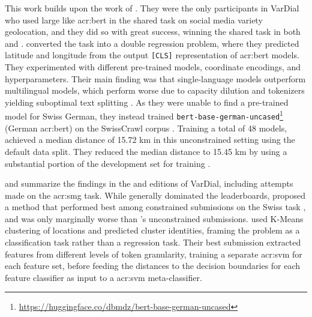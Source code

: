 This work builds upon the work of \cite{scherrerHeLjuVarDial20202020}. They were the only participants in VarDial who used large  like \acrshort{acr:bert} in the shared task on social media variety geolocation, and they did so with great success, winning the shared task in both \citeyear{scherrerHeLjuVarDial20202020} and \citeyear{scherrerSocialMediaVariety2021}. \citeauthor{scherrerHeLjuVarDial20202020} converted the task into a double regression problem, where they predicted latitude and longitude from the output \texttt{[CLS]} representation of \acrshort{acr:bert} models. They experimented with different pre-trained models, coordinate encodings, and hyperparameters. Their main finding was that single-language models outperform multilingual models, which perform worse due to capacity dilution and tokenizers yielding suboptimal text splitting \citep[3]{scherrerHeLjuVarDial20202020}. As they were unable to find a pre-trained model for Swiss German, they instead trained \texttt{bert-base-german-uncased}\footnote{\url{https://huggingface.co/dbmdz/bert-base-german-uncased}} (German \acrshort{acr:bert}) on the SwissCrawl corpus \citep{linderAutomaticCreationText2020}. Training a total of 48 models, \citeauthor{scherrerHeLjuVarDial20202020} achieved a median distance of 15.72 km in this unconstrained setting using the default data split. They reduced the median distance to 15.45 km by using a substantial portion of the development set for training \citep[6]{scherrerHeLjuVarDial20202020}.

\cite{gamanReportVarDialEvaluation2020} and \cite{chakravarthiFindingsVarDialEvaluation2021} summarize the findings in the \citeyear{gamanReportVarDialEvaluation2020} and \citeyear{chakravarthiFindingsVarDialEvaluation2021} editions of VarDial, including attempts made on the \gls{acr:smg} task. While \cite{scherrerHeLjuVarDial20202020} generally dominated the leaderboards, \cite{benitesdeazevedoesouzaZHAWInITSocialMedia2020} proposed a method that performed best among constrained submissions on the Swiss task \citep[8-9]{gamanReportVarDialEvaluation2020}, and was only marginally worse than \citeauthor{scherrerHeLjuVarDial20202020}'s unconstrained submissions. \cite{benitesdeazevedoesouzaZHAWInITSocialMedia2020} used K-Means clustering \citep{lloydLeastSquaresQuantization1982a} of locations and predicted cluster identities, framing the problem as a classification task rather than a regression task. Their best submission extracted features from different levels of token granularity, training a separate \gls{acr:svm} for each feature set, before feeding the distances to the decision boundaries for each feature classifier as input to a \gls{acr:svm} meta-classifier.

